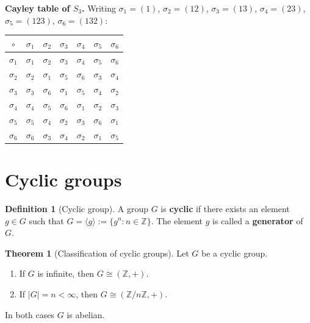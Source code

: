 \documentclass[12pt,a4paper,openany]{book}
\theoremstyle{definition}
\newtheorem{definition}{Definition}[chapter]
\newtheorem{theorem}{Theorem}[chapter]
\theoremstyle{remark}
\newcommand{\Z}{\mathbb{Z}}
\begin{document}
\medskip

\noindent\textbf{Cayley table of $S_3$.}
Writing $\sigma_1=(1)$, $\sigma_2=(12)$, $\sigma_3=(13)$, $\sigma_4=(23)$,
$\sigma_5=(123)$, $\sigma_6=(132)$:
\begin{center}
\begin{tabular}{c|cccccc}
  $\circ$ & $\sigma_1$ & $\sigma_2$ & $\sigma_3$ & $\sigma_4$ &
  $\sigma_5$ & $\sigma_6$\\
  \hline
  $\sigma_1$ & $\sigma_1$ & $\sigma_2$ & $\sigma_3$ & $\sigma_4$ &
    $\sigma_5$ & $\sigma_6$\\
  $\sigma_2$ & $\sigma_2$ & $\sigma_1$ & $\sigma_5$ & $\sigma_6$ &
    $\sigma_3$ & $\sigma_4$\\
  $\sigma_3$ & $\sigma_3$ & $\sigma_6$ & $\sigma_1$ & $\sigma_5$ &
    $\sigma_4$ & $\sigma_2$\\
  $\sigma_4$ & $\sigma_4$ & $\sigma_5$ & $\sigma_6$ & $\sigma_1$ &
    $\sigma_2$ & $\sigma_3$\\
  $\sigma_5$ & $\sigma_5$ & $\sigma_4$ & $\sigma_2$ & $\sigma_3$ &
    $\sigma_6$ & $\sigma_1$\\
  $\sigma_6$ & $\sigma_6$ & $\sigma_3$ & $\sigma_4$ & $\sigma_2$ &
    $\sigma_1$ & $\sigma_5$
\end{tabular}
\end{center}

\section{Cyclic groups}
\label{sec:ch1-cyclic}

\begin{definition}[Cyclic group]
\label{def:cyclic-group}
A group $G$ is \textbf{cyclic} if there exists an element $g\in G$ such that
$G=\langle g\rangle := \{g^n : n\in\Z\}$.  The element $g$ is called a
\textbf{generator} of $G$.
\end{definition}

\begin{theorem}[Classification of cyclic groups]
\label{thm:cyclic-classification}
Let $G$ be a cyclic group.
\begin{enumerate}[label=(\roman*)]
  \item If $G$ is infinite, then $G\cong(\Z,+)$.
  \item If $|G|=n<\infty$, then $G\cong(\Z/n\Z,+)$.
\end{enumerate}
In both cases $G$ is abelian.
\end{theorem}
\end{document}
